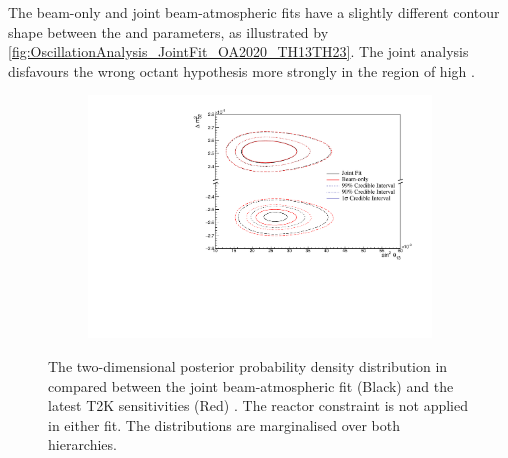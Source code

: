 The beam-only and joint beam-atmospheric fits have a slightly different contour shape between the  and  parameters, as illustrated by \autoref{fig:OscillationAnalysis_JointFit_OA2020_TH13TH23}. The joint analysis disfavours the wrong octant hypothesis more strongly in the region of high . %

\begin{figure}[h]
  \begin{subfigure}[t]{0.98\textwidth}
    \includegraphics[width=\textwidth, trim={0mm 0mm 0mm 0mm}, clip,page=1]{Figures/OA/JointFit_OA2020_Comp/ContourComparison_2D_th13_dm32_BH_0_woRC_UnSmeared_CredibleInterval.pdf}
  \end{subfigure}
  \caption{The two-dimensional posterior probability density distribution in  compared between the joint beam-atmospheric fit (Black) and the latest T2K sensitivities (Red) \cite{Dunne2020-uf, t2k_tn_393}. The reactor constraint is not applied in either fit. The distributions are marginalised over both hierarchies.}
  \label{fig:OscillationAnalysis_JointFit_OA2020_DM32TH13}
\end{figure}

